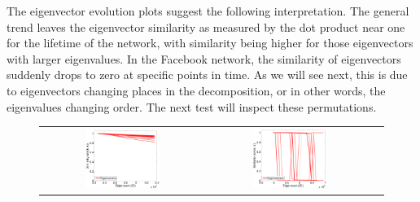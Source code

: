 \documentclass[11pt,a4paper]{book}
\newcommand{\wTwo}{0.48}
\begin{document}
The eigenvector evolution plots suggest the following interpretation. 
The general trend leaves the eigenvector similarity as measured by the
dot product near one for the lifetime of the network, with 
similarity being higher for those eigenvectors with larger eigenvalues.
In the Facebook network, the similarity of eigenvectors
suddenly drops to zero at specific points in time.  As we will see next,
this is due to eigenvectors changing places in the decomposition, or in other
words, the eigenvalues changing order.  The next test will inspect these
permutations.

\begin{figure}[h!]
  \centering
  \begin{tabular}{ccc}
    \includegraphics[width=\wTwo\textwidth]{img-st/time.eigenvalue_evolution.sym.wikipedia-growth} &
    \includegraphics[width=\wTwo\textwidth]{img-st/time.eigenvalue_evolution.sym.facebook-wosn-wall} \\

\end{tabular}
\end{figure}
\end{document}
